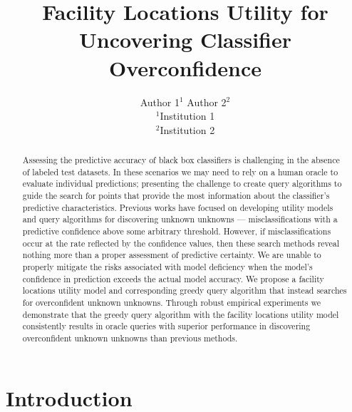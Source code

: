 \documentclass[letterpaper]{article} %
\begin{document}
%
\title{Facility Locations Utility for Uncovering Classifier Overconfidence}
\author{Author 1$^1$ \hspace{.2in} Author 2$^2$\\
$^1$Institution 1\\ 
$^2$Institution 2\\
}

\maketitle
\begin{abstract}
Assessing the predictive accuracy of black box classifiers is challenging in the absence of labeled test datasets. In these scenarios we may need to rely on a human oracle to evaluate individual predictions; presenting the challenge to create query algorithms to guide the search for points that provide the most information about the classifier's predictive characteristics. Previous works have focused on developing utility models and query algorithms for discovering unknown unknowns --- misclassifications with a predictive confidence above some arbitrary threshold. However, if misclassifications occur at the rate reflected by the confidence values, then these search methods reveal nothing more than a proper assessment of predictive certainty. We are unable to properly mitigate the risks associated with model deficiency when the model's confidence in prediction exceeds the actual model accuracy. We propose a facility locations utility model and corresponding greedy query algorithm that instead searches for overconfident unknown unknowns. Through robust empirical experiments we demonstrate that the greedy query algorithm with the facility locations utility model consistently results in oracle queries with superior performance in discovering overconfident unknown unknowns than previous methods. 
\end{abstract}

\section{Introduction}
\end{document}
